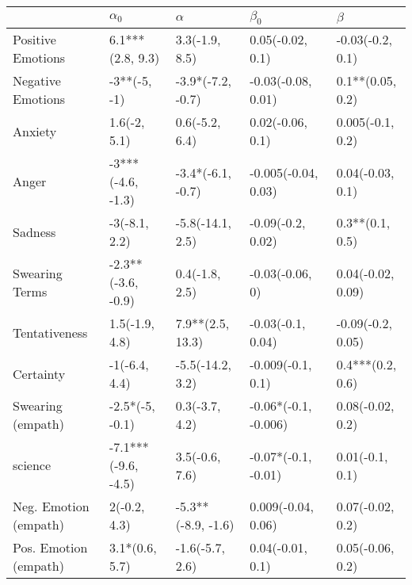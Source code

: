 \begin{tabular}{lllll}
\toprule
{} &           $\alpha_0$ &            $\alpha$ &             $\beta_0$ &            $\beta$ \\
\midrule
Positive Emotions     &     6.1***(2.8, 9.3) &      3.3(-1.9, 8.5) &      0.05(-0.02, 0.1) &   -0.03(-0.2, 0.1) \\
Negative Emotions     &         -3**(-5, -1) &   -3.9*(-7.2, -0.7) &    -0.03(-0.08, 0.01) &   0.1**(0.05, 0.2) \\
Anxiety               &         1.6(-2, 5.1) &      0.6(-5.2, 6.4) &      0.02(-0.06, 0.1) &   0.005(-0.1, 0.2) \\
Anger                 &    -3***(-4.6, -1.3) &   -3.4*(-6.1, -0.7) &   -0.005(-0.04, 0.03) &   0.04(-0.03, 0.1) \\
Sadness               &        -3(-8.1, 2.2) &    -5.8(-14.1, 2.5) &     -0.09(-0.2, 0.02) &    0.3**(0.1, 0.5) \\
Swearing Terms        &   -2.3**(-3.6, -0.9) &      0.4(-1.8, 2.5) &       -0.03(-0.06, 0) &  0.04(-0.02, 0.09) \\
Tentativeness         &       1.5(-1.9, 4.8) &    7.9**(2.5, 13.3) &     -0.03(-0.1, 0.04) &  -0.09(-0.2, 0.05) \\
Certainty             &        -1(-6.4, 4.4) &    -5.5(-14.2, 3.2) &     -0.009(-0.1, 0.1) &   0.4***(0.2, 0.6) \\
Swearing (empath)     &      -2.5*(-5, -0.1) &      0.3(-3.7, 4.2) &  -0.06*(-0.1, -0.006) &   0.08(-0.02, 0.2) \\
science               &  -7.1***(-9.6, -4.5) &      3.5(-0.6, 7.6) &   -0.07*(-0.1, -0.01) &    0.01(-0.1, 0.1) \\
Neg. Emotion (empath) &         2(-0.2, 4.3) &  -5.3**(-8.9, -1.6) &    0.009(-0.04, 0.06) &   0.07(-0.02, 0.2) \\
Pos. Emotion (empath) &       3.1*(0.6, 5.7) &     -1.6(-5.7, 2.6) &      0.04(-0.01, 0.1) &   0.05(-0.06, 0.2) \\
\bottomrule
\end{tabular}
